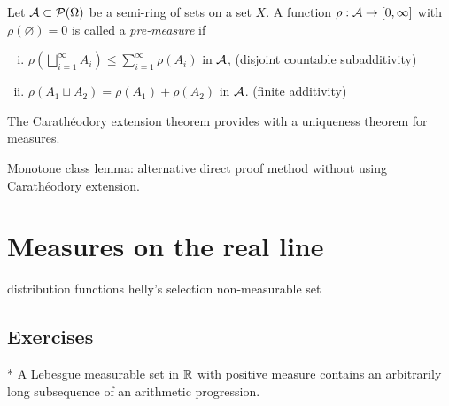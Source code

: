 \documentclass{../note}
\begin{document}
\begin{prb}
Let $\mathcal{A}\subset\mathcal{P}(\Omega)$ be a semi-ring of sets on a set $X$.
A function $\rho:\mathcal{A}\to[0,\infty]$ with $\rho(\varnothing)=0$ is called a \emph{pre-measure} if
\begin{enumerate}[(i)]
\item $\rho(\bigsqcup_{i=1}^\infty A_i)\le\sum_{i=1}^\infty\rho(A_i)$ in $\mathcal{A}$,
\hfill(disjoint countable subadditivity)
\item $\rho(A_1\sqcup A_2)=\rho(A_1)+\rho(A_2)$ in $\mathcal{A}$.
\hfill(finite additivity)
\end{enumerate}
\begin{parts}
\item 
\end{parts}
\end{prb}



\begin{prb}
The Carath\'eodory extension theorem provides with a uniqueness theorem for measures.
\end{prb}



Monotone class lemma: alternative direct proof method without using Carath\'eodory extension.


\chapter{Measures on the real line}

distribution functions
helly's selection
non-measurable set


\section*{Exercises}
\begin{prb}
\end{prb}
\begin{prb}*
A Lebesgue measurable set in $\mathbb{R}$ with positive measure contains an arbitrarily long subsequence of an arithmetic progression.
\end{prb}
\end{document}
